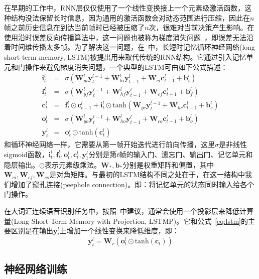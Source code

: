 在早期的工作中，RNN层仅仅使用了一个线性变换接上一个元素级激活函数，这种结构没法保留长时信息，因为通用的激活函数会对动态范围进行压缩，因此在$n$帧之前历史信息在到达当前帧时已经被压缩了$n$次，很难对当前决策产生影响。在使用沿时误差反向传播算法中，这一问题也被称为梯度消失问题~\cite{bengio1994learning}，即误差无法沿着时间维传播太多帧。为了解决这一问题，在~\cite{hochreiter1997long}中，长短时记忆循环神经网络(long short-term memory, LSTM)被提出用来取代传统的RNN结构。它通过引入记忆单元和门操作来避免梯度消失问题，一个典型的LSTM可由如下公式描述：
\begin{eqnarray}
    \label{eq:lstm}
    \mathbf{i}^l_t &=& \sigma( \mathbf{W}^l_{yi} \mathbf{y}^{l-1}_t + \mathbf{W}^l_{hi} \mathbf{y}^l_{t-1} + \mathbf{W}_{ci} \mathbf{c}^l_{t-1} + \mathbf{b}^l_i) \\
    \mathbf{f}^l_t &=& \sigma( \mathbf{W}^l_{yf} \mathbf{y}^{l-1}_t + \mathbf{W}^l_{hf} \mathbf{y}^l_{t-1} + \mathbf{W}_{cf} \mathbf{c}^l_{t-1} + \mathbf{b}^l_f) \\
    \mathbf{c}^l_t &=& \mathbf{f}^l_t \odot \mathbf{c}^l_{t-1} + \mathbf{i}^l_t \odot \text{tanh}(\mathbf{W}_{yc} \mathbf{y}^{l-1}_t + \mathbf{W}_{hc} \mathbf{c}^l_{t-1} + \mathbf{b}^l_c) \\
    \mathbf{o}^l_t &=& \sigma( \mathbf{W}^l_{yo} \mathbf{y}^{l-1}_t + \mathbf{W}^l_{ho} \mathbf{y}^l_{t-1} + \mathbf{W}_{co} \mathbf{c}^l_{t-1} + \mathbf{b}^l_o) \\
    \mathbf{y}^l_t &=& \mathbf{o}^l_t \odot \text{tanh}(\mathbf{c}^l_t)
\end{eqnarray}
和循环神经网络一样，它需要从第一帧开始迭代进行前向传播，这里$\sigma$是非线性sigmoid函数，$\mathbf{i}^l_t, \mathbf{f}^l_t, \mathbf{o}^l_t, \mathbf{c}^l_t, \mathbf{y}^l_t$分别是第$t$帧的输入门、遗忘门、输出门、记忆单元和隐层输出。$\odot$表示元素级乘法。$\mathbf{W}_*, \mathbf{b}_*$分别是权重矩阵和偏置，其中$\mathbf{W}_{ci}, \mathbf{W}_{cf}, \mathbf{W}_{co}$是对角矩阵。与最初的LSTM结构不同之处在于，在这一结构中我们增加了窥孔连接(peephole connection)。即：将记忆单元的状态同时输入给各个门操作。

在大词汇连续语音识别任务中，按照~\cite{sak2014long}中建议，通常会使用一个投影层来降低计算量(Long Short-Term Memory with Projection, LSTMP)。它和公式~\ref{eq:lstm}的主要区别是在输出$\mathbf{y}^l_t$上增加一个线性变换来降低维度，即：
\begin{equation}
    \mathbf{y}^l_t = \mathbf{W}_{r} ( \mathbf{o}^l_t \odot \text{tanh}(\mathbf{c}_t) )
\end{equation}

\subsection{神经网络训练}
